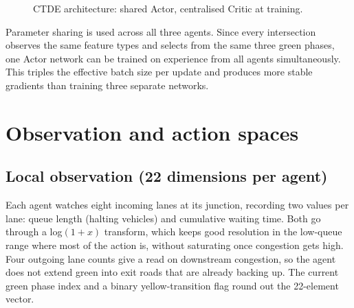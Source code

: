 ﻿\documentclass[11pt, a4paper]{report}
\begin{document}
\begin{figure}[H]
\centering
{}
\caption{CTDE architecture: shared Actor, centralised Critic at training.}
\label{fig:ctde_arch}
\end{figure}

Parameter sharing is used across all three agents. Since every intersection observes the same feature types and selects from the same three green phases, one Actor network can be trained on experience from all agents simultaneously. This triples the effective batch size per update and produces more stable gradients than training three separate networks.

\section{Observation and action spaces}

\subsection{Local observation (22 dimensions per agent)}

Each agent watches eight incoming lanes at its junction, recording two values per lane: queue length (halting vehicles) and cumulative waiting time. Both go through a log$(1+x)$ transform, which keeps good resolution in the low-queue range where most of the action is, without saturating once congestion gets high. Four outgoing lane counts give a read on downstream congestion, so the agent does not extend green into exit roads that are already backing up. The current green phase index and a binary yellow-transition flag round out the 22-element vector.
\end{document}
